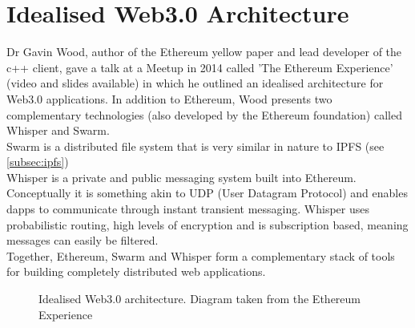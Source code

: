 \section{Idealised Web3.0 Architecture}
\label{sec:web3Arch}
Dr Gavin Wood, author of the Ethereum yellow paper\cite{wood2014ethereum} and lead developer of the c++ client, gave a talk at a Meetup in 2014 called 'The Ethereum Experience' (video\cite{Web3Vid} and slides\cite{Web3Slides} available) in which he outlined an idealised architecture for Web3.0 applications. In addition to Ethereum, Wood presents two complementary technologies (also developed by the Ethereum foundation) called Whisper and Swarm.\\ 

Swarm is a distributed file system that is very similar in nature to IPFS (see \ref{subsec:ipfs})\\

Whisper is a private and public messaging system built into Ethereum. Conceptually it is something akin to UDP (User Datagram Protocol) and enables dapps to communicate through instant transient messaging. Whisper uses probabilistic routing, high levels of encryption and is subscription based, meaning messages can easily be filtered.\\

Together, Ethereum, Swarm and Whisper form a complementary stack of tools for building completely distributed web applications.\\ 
\begin{figure}
\centering
{}
\decoRule
\caption[Idealised Web3.0 Architecture]{Idealised Web3.0 architecture. Diagram taken from the Ethereum Experience \cite{Web3Slides}}
\label{fig:DappArch}
\end{figure}

